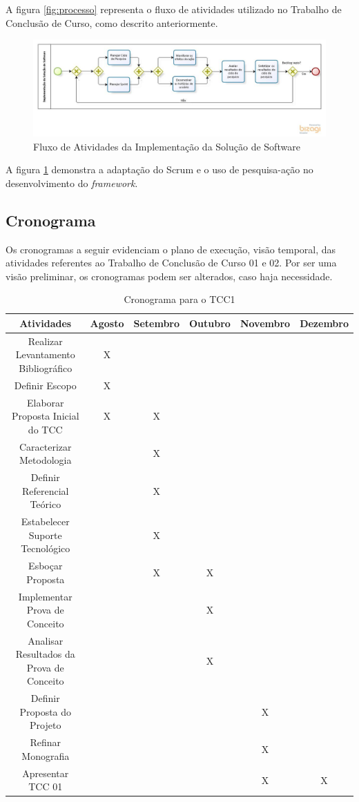 \par 
\indent A figura \ref{fig:processo} representa o fluxo de atividades utilizado no Trabalho de Conclusão de Curso, como descrito anteriormente.  
  
    \begin{figure}[h]
    \centering
    \includegraphics[width=\textwidth]{figuras/ProcessoInterno.jpg}
    \caption{Fluxo de Atividades da Implementação da Solução de Software}
    \label{fig:processointerno}
  \end{figure}

\par 
\indent A figura \ref{fig:processointerno} demonstra a adaptação do Scrum e o uso de pesquisa-ação no desenvolvimento do \textit{framework}. 
 
 \subsection{Cronograma}
 
	Os cronogramas a seguir evidenciam o plano de execução, visão temporal, das atividades referentes ao Trabalho de Conclusão de Curso 01 e 02. Por ser uma visão preliminar, os cronogramas podem ser alterados, caso haja necessidade. 
	  
\begin{table}[]
  \tiny
  \centering
  \caption{Cronograma para o TCC1}
  \label{cronograma-tcc-1}
  \begin{tabular}{| c | c | c | c | c | c |}
    \hline
    Atividades & Agosto & Setembro & Outubro & Novembro & Dezembro \\ \hline
    Realizar Levantamento Bibliográfico & X &  &  &  &  \\
    Definir Escopo & X &  &  &  &  \\
    Elaborar Proposta Inicial do TCC & X & X &  &  &  \\
    Caracterizar Metodologia &  & X &  &  &  \\
    Definir Referencial Teórico &  & X &  &  &  \\
    Estabelecer Suporte Tecnológico &  & X &  &  &  \\
    Esboçar Proposta &  & X & X &  &  \\
    Implementar Prova de Conceito &  &  & X &  &  \\
    Analisar Resultados da Prova de Conceito &  &  & X &  &  \\
    Definir Proposta do Projeto &  &  &  & X &  \\
    Refinar Monografia &  &  &  & X &  \\
    Apresentar TCC 01 &  &  &  & X & X \\ \hline
  \end{tabular}
\end{table}
  
